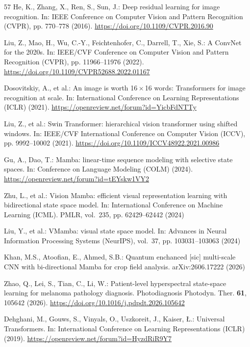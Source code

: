 \documentclass{svproc}
\begin{document}
\begin{thebibliography}{57}
He, K., Zhang, X., Ren, S., Sun, J.: Deep residual learning for image recognition. In: IEEE Conference on Computer Vision and Pattern Recognition (CVPR), pp. 770--778 (2016). \url{https://doi.org/10.1109/CVPR.2016.90}

Liu, Z., Mao, H., Wu, C.-Y., Feichtenhofer, C., Darrell, T., Xie, S.: A ConvNet for the 2020s. In: IEEE/CVF Conference on Computer Vision and Pattern Recognition (CVPR), pp. 11966--11976 (2022). \url{https://doi.org/10.1109/CVPR52688.2022.01167}

Dosovitskiy, A., et al.: An image is worth 16\,$\times$\,16 words: Transformers for image recognition at scale. In: International Conference on Learning Representations (ICLR) (2021). \url{https://openreview.net/forum?id=YicbFdNTTy}

Liu, Z., et al.: Swin Transformer: hierarchical vision transformer using shifted windows. In: IEEE/CVF International Conference on Computer Vision (ICCV), pp. 9992--10002 (2021). \url{https://doi.org/10.1109/ICCV48922.2021.00986}

Gu, A., Dao, T.: Mamba: linear-time sequence modeling with selective state spaces. In: Conference on Language Modeling (COLM) (2024). \url{https://openreview.net/forum?id=tEYskw1VY2}

Zhu, L., et al.: Vision Mamba: efficient visual representation learning with bidirectional state space model. In: International Conference on Machine Learning (ICML). PMLR, vol.~235, pp. 62429--62442 (2024)

Liu, Y., et al.: VMamba: visual state space model. In: Advances in Neural Information Processing Systems (NeurIPS), vol.~37, pp. 103031--103063 (2024)

Khan, M.S., Atoofian, E., Ahmed, S.B.: Quantum enchanced [sic] multi-scale CNN with bi-directional Mamba for crop field analysis. arXiv:2606.17222 (2026)

Zhao, Q., Lei, S., Tian, C., Li, W.: Patient-level hyperspectral state-space learning for melanoma pathology diagnosis. Photodiagnosis Photodyn. Ther. \textbf{61}, 105642 (2026). \url{https://doi.org/10.1016/j.pdpdt.2026.105642}

Dehghani, M., Gouws, S., Vinyals, O., Uszkoreit, J., Kaiser, \L.: Universal Transformers. In: International Conference on Learning Representations (ICLR) (2019). \url{https://openreview.net/forum?id=HyzdRiR9Y7}


\end{thebibliography}
\end{document}
